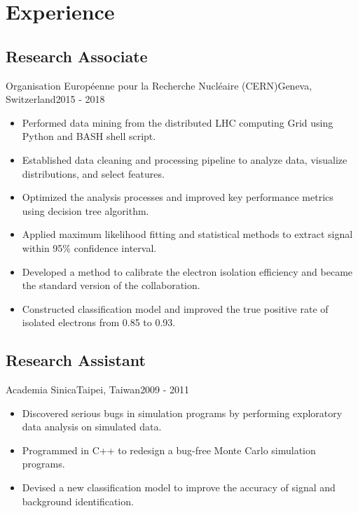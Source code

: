 \documentclass[11pt, letterpaper]{yt_resume}   	%
\begin{document}

\section{Experience}

\subsection{Research Associate}{Organisation Europ\'{e}enne pour la Recherche Nucl\'{e}aire (CERN)}{Geneva, Switzerland}{2015 - 2018}
\begin{itemize}
\item Performed data mining from the distributed LHC computing Grid using Python and BASH shell script.
\item Established data cleaning and processing pipeline to analyze data, visualize distributions, and select features.
\item Optimized the analysis processes and improved key performance metrics using decision tree algorithm.
\item Applied maximum likelihood fitting and statistical methods to extract signal within 95\% confidence interval.
\item Developed a method to calibrate the electron isolation efficiency and became the standard version of the collaboration.
\item Constructed classification model and improved the true positive rate of isolated electrons from 0.85 to 0.93.
\end{itemize}

\subsection{Research Assistant}{Academia Sinica}{Taipei, Taiwan}{2009 - 2011}
\begin{itemize}
\item Discovered serious bugs in simulation programs by performing exploratory data analysis on simulated data.
\item Programmed in C++ to redesign a bug-free Monte Carlo simulation programs.
\item Devised a new classification model to improve the accuracy of signal and background identification.
\end{itemize}
\end{document}
